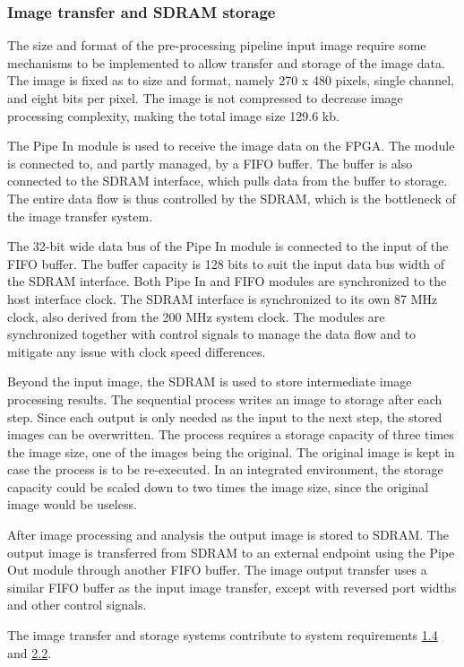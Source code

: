 \documentclass[12pt]{report}
\begin{document}
\subsubsection{Image transfer and SDRAM storage}
The size and format of the pre-processing pipeline input image require some mechanisms to be implemented to allow transfer and storage of the image data. The image is fixed as to size and format, namely 270 x 480 pixels, single channel, and eight bits per pixel. The image is not compressed to decrease image processing complexity, making the total image size 129.6 kb.
\par
The Pipe In module is used to receive the image data on the FPGA. The module is connected to, and partly managed, by a FIFO buffer. The buffer is also connected to the SDRAM interface, which pulls data from the buffer to storage. The entire data flow is thus controlled by the SDRAM, which is the bottleneck of the image transfer system. \citep{stpp}
\par
The 32-bit wide data bus of the Pipe In module is connected to the input of the FIFO buffer. The buffer capacity is 128 bits to suit the input data bus width of the SDRAM interface. Both Pipe In and FIFO modules are synchronized to the host interface clock. The SDRAM interface is synchronized to its own 87 MHz clock, also derived from the 200 MHz system clock. The modules are synchronized together with control signals to manage the data flow and to mitigate any issue with clock speed differences. \citep{stpp}
\par
Beyond the input image, the SDRAM is used to store intermediate image processing results. The sequential process writes an image to storage after each step. Since each output is only needed as the input to the next step, the stored images can be overwritten. The process requires a storage capacity of three times the image size, one of the images being the original. The original image is kept in case the process is to be re-executed. In an integrated environment, the storage capacity could be scaled down to two times the image size, since the original image would be useless. \citep{stpp} %
\par
After image processing and analysis the output image is stored to SDRAM. The output image is transferred from SDRAM to an external endpoint using the Pipe Out module through another FIFO buffer. The image output transfer uses a similar FIFO buffer as the input image transfer, except with reversed port widths and other control signals. \citep{stpp}
\par
The image transfer and storage systems contribute to system requirements \hyperref[req1.4]{1.4} and \hyperref[req2.2]{2.2}.
\end{document}
